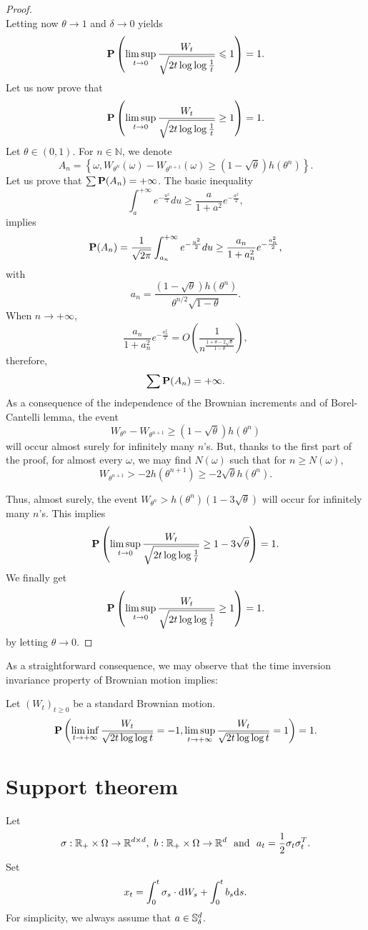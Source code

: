 \begin{proof}
$$		$$
		Letting now $\theta \rightarrow 1$ and $\delta \rightarrow 0$ yields
		$$
		{\mathbf P} \left( \limsup_{t \rightarrow 0} \frac{W_{t}}{\sqrt{2t \log  \log  \frac{1}{t}}} \leqslant 1\right)=1.  
		$$
		Let us now prove that
		$$
		{\mathbf P} \left( \limsup_{t \rightarrow 0} \frac{W_{t}}{\sqrt{2t\log  \log  \frac{1}{t}}} \ge 1 \right)=1.  
		$$
		Let $\theta \in (0,1)$. For $n \in \mathbb{N}$, we denote
		$$
		A_n=\left\{ \omega, W_{\theta^n}(\omega)-W_{\theta^{n+1}}(\omega) \ge (1-\sqrt{\theta})h(\theta^n)\right\}.  
		$$
		Let us prove that $\sum {\mathbf P}  (A_n)=+\infty$.  The basic inequality
		$$
		\int_{a}^{+\infty} e^{-\frac{u^2}{2}}du \ge \frac{a}{1+a^2}e^{-\frac{a^2}{2}},  
		$$
		implies
		$$
		{\mathbf P}  (A_n)=\frac{1}{\sqrt{2\pi}}\int_{a_n}^{+\infty}e^{-\frac{u^2}{2}}du  \ge \frac{a_n}{1+a_n^2}e^{-\frac{a_n^2}{2}},  
		$$
		with
		$$
		a_n=\frac{(1-\sqrt{\theta})h(\theta^n)}{\theta^{n/2} \sqrt{1-\theta}}.  
		$$
		When $n \to +\infty$,
		$$
		\frac{a_n}{1+a_n^2} e^{-\frac{a_n^2}{2}}=O\left(\frac{1}{n^{\frac{1+\theta-2\sqrt{\theta}}{1-\theta}}}\right),  
		$$
		therefore,
		$$
		\sum {\mathbf P}  (A_n)=+\infty.  
		$$
		As a consequence of the independence of the Brownian increments and of Borel-Cantelli lemma, the event
		$$
		W_{\theta^n}-W_{\theta^{n+1}} \ge (1-\sqrt{\theta})h(\theta^n)  
		$$
		will occur almost surely for infinitely many $n$'s. But, thanks to the first part of the proof, for almost every $\omega$, we may find $N(\omega)$ such that for $n \ge N(\omega)$,
		$$
		W_{\theta^{n+1}}>-2h(\theta^{n+1})\ge-2\sqrt{\theta} h(\theta^n).  
		$$
		
		Thus, almost surely, the event $W_{\theta^n} >h(\theta^n)(1-3\sqrt{\theta})$ will occur for infinitely many $n$'s. This implies
		$$
		{\mathbf P} \left( \limsup_{t \rightarrow 0} \frac{W_{t}}{\sqrt{2t \log  \log  \frac{1}{t}}} \ge 1-3\sqrt{\theta} \right)=1.  
		$$
		We finally get
		\[
		{\mathbf P} \left( \limsup_{t \rightarrow 0} \frac{W_{t}}{\sqrt{2t \log  \log  \frac{1}{t}}} \ge 1 \right)=1.  
		\]
		by letting $\theta \to 0$. 
	\end{proof}
	As a straightforward consequence, we may observe that the time inversion invariance property of Brownian motion implies: 
	\begin{corollary}
		Let $(W_t)_{t\ge 0}$ be a standard Brownian motion.
		\[ 
		{\mathbf P} \left( \liminf_{t \rightarrow +\infty} \frac{W_{t}}{\sqrt{2t \log  \log  t}} =-1,\limsup_{t \rightarrow +\infty} \frac{W_{t}}{\sqrt{2t \log  \log  t}} =1\right)=1.
		\]
	\end{corollary}

	
\section{Support theorem} 
Let 
\[
    \sigma: {\mathbb R}_+\times\Omega\to {\mathbb R}^{d\times d}, ~ b:{\mathbb R}_+\times\Omega\to {\mathbb R}^d ~\mbox{ and }~ a_t=\frac{1}{2} \sigma_t\sigma_t^{T}. 
\]
Set 
\begin{equation}\label{eq:Ito-process}
    x_t= \int_0^t \sigma_s \cdot \text{\rm{d}} W_s+\int_0^t b_s \text{\rm{d}} s. 
\end{equation}
For simplicity,  we always assume that $a\in {\mathbb S}^d_{\delta}$. 

